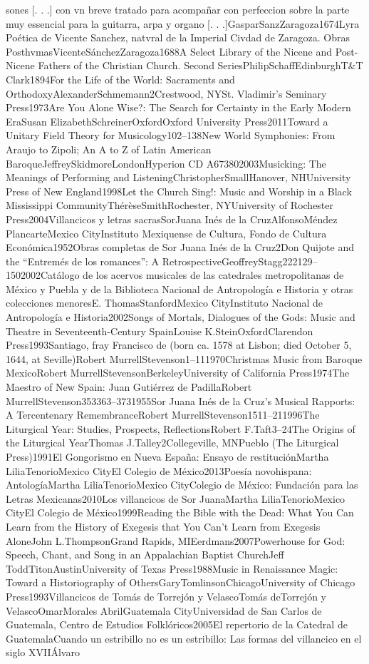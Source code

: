 \documentclass{memoir}
\begin{document}
{{{{{{{{sones [. . .] con vn breve tratado para acompañar con perfeccion sobre la parte muy essencial para la guitarra, arpa y organo [. . .]GasparSanzZaragoza1674Lyra Poética de Vicente Sanchez, natvral de la Imperial Civdad de Zaragoza. Obras PosthvmasVicenteSánchezZaragoza1688A Select Library of the Nicene and Post-Nicene Fathers of the Christian Church. Second SeriesPhilipSchaffEdinburghT&T Clark1894For the Life of the World: Sacraments and OrthodoxyAlexanderSchmemann2Crestwood, NYSt. Vladimir's Seminary Press1973Are You Alone Wise?: The Search for Certainty in the Early Modern EraSusan ElizabethSchreinerOxfordOxford University Press2011Toward a Unitary Field Theory for Musicology102–138New World Symphonies: From Araujo to Zipoli; An A to Z of Latin American BaroqueJeffreySkidmoreLondonHyperion CD A673802003Musicking: The Meanings of Performing and ListeningChristopherSmallHanover, NHUniversity Press of New England1998Let the Church Sing!: Music and Worship in a Black Mississippi CommunityThérèseSmithRochester, NYUniversity of Rochester Press2004Villancicos y letras sacrasSorJuana Inés de la CruzAlfonsoMéndez PlancarteMexico CityInstituto Mexiquense de Cultura, Fondo de Cultura Económica1952Obras completas de Sor Juana Inés de la Cruz2Don Quijote and the “Entremés de los romances”: A RetrospectiveGeoffreyStagg222129–1502002Catálogo de los acervos musicales de las catedrales metropolitanas de México y Puebla y de la Biblioteca Nacional de Antropología e Historia y otras colecciones menoresE. ThomasStanfordMexico CityInstituto Nacional de Antropología e Historia2002Songs of Mortals, Dialogues of the Gods: Music and Theatre in Seventeenth-Century SpainLouise K.SteinOxfordClarendon Press1993Santiago, fray Francisco de (born ca. 1578 at Lisbon; died October 5, 1644, at Seville)Robert MurrellStevenson1–111970Christmas Music from Baroque MexicoRobert MurrellStevensonBerkeleyUniversity of California Press1974The \mkbibquoteDistinguished Maestro of New Spain: Juan Gutiérrez de PadillaRobert MurrellStevenson353363–3731955Sor Juana Inés de la Cruz's Musical Rapports: A Tercentenary RemembranceRobert MurrellStevenson1511–211996The Liturgical Year: Studies, Prospects, ReflectionsRobert F.Taft3–24The Origins of the Liturgical YearThomas J.Talley2Collegeville, MNPueblo (The Liturgical Press)1991El Gongorismo en Nueva España: Ensayo de restituciónMartha LiliaTenorioMexico CityEl Colegio de México2013Poesía novohispana: AntologíaMartha LiliaTenorioMexico CityColegio de México: Fundación para las Letras Mexicanas2010Los villancicos de Sor JuanaMartha LiliaTenorioMexico CityEl Colegio de México1999Reading the Bible with the Dead: What You Can Learn from the History of Exegesis that You Can't Learn from Exegesis AloneJohn L.ThompsonGrand Rapids, MIEerdmans2007Powerhouse for God: Speech, Chant, and Song in an Appalachian Baptist ChurchJeff ToddTitonAustinUniversity of Texas Press1988Music in Renaissance Magic: Toward a Historiography of OthersGaryTomlinsonChicagoUniversity of Chicago Press1993Villancicos de Tomás de Torrejón y VelascoTomás deTorrejón y VelascoOmarMorales AbrilGuatemala CityUniversidad de San Carlos de Guatemala, Centro de Estudios Folklóricos2005El repertorio de la Catedral de GuatemalaCuando un estribillo no es un estribillo: Las formas del villancico en el siglo XVIIÁlvaro }}}}}}}}
\end{document}
